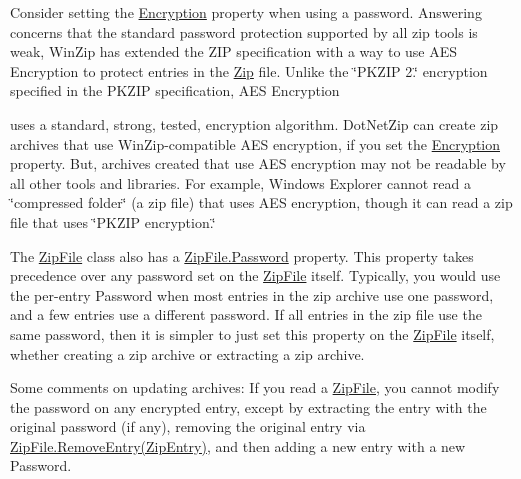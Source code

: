Consider setting the \mbox{\hyperlink{class_super_tiled2_unity_1_1_ionic_1_1_zip_1_1_zip_entry_ab8de4882ffe896d2657b27264807ef1c}{Encryption}} property when using a password. Answering concerns that the standard password protection supported by all zip tools is weak, Win\+Zip has extended the Z\+IP specification with a way to use A\+ES Encryption to protect entries in the \mbox{\hyperlink{namespace_super_tiled2_unity_1_1_ionic_1_1_zip}{Zip}} file. Unlike the \char`\"{}\+P\+K\+Z\+I\+P 2.\char`\"{} encryption specified in the P\+K\+Z\+IP specification, A\+ES Encryption

uses a standard, strong, tested, encryption algorithm. Dot\+Net\+Zip can create zip archives that use Win\+Zip-\/compatible A\+ES encryption, if you set the \mbox{\hyperlink{class_super_tiled2_unity_1_1_ionic_1_1_zip_1_1_zip_entry_ab8de4882ffe896d2657b27264807ef1c}{Encryption}} property. But, archives created that use A\+ES encryption may not be readable by all other tools and libraries. For example, Windows Explorer cannot read a \char`\"{}compressed folder\char`\"{} (a zip file) that uses A\+ES encryption, though it can read a zip file that uses \char`\"{}\+P\+K\+Z\+I\+P encryption.\char`\"{} 

The \mbox{\hyperlink{class_super_tiled2_unity_1_1_ionic_1_1_zip_1_1_zip_file}{Zip\+File}} class also has a \mbox{\hyperlink{class_super_tiled2_unity_1_1_ionic_1_1_zip_1_1_zip_file_a32b5a69438b625f81303940ec70f9c39}{Zip\+File.\+Password}} property. This property takes precedence over any password set on the \mbox{\hyperlink{class_super_tiled2_unity_1_1_ionic_1_1_zip_1_1_zip_file}{Zip\+File}} itself. Typically, you would use the per-\/entry Password when most entries in the zip archive use one password, and a few entries use a different password. If all entries in the zip file use the same password, then it is simpler to just set this property on the \mbox{\hyperlink{class_super_tiled2_unity_1_1_ionic_1_1_zip_1_1_zip_file}{Zip\+File}} itself, whether creating a zip archive or extracting a zip archive. 

Some comments on updating archives\+: If you read a {\ttfamily \mbox{\hyperlink{class_super_tiled2_unity_1_1_ionic_1_1_zip_1_1_zip_file}{Zip\+File}}}, you cannot modify the password on any encrypted entry, except by extracting the entry with the original password (if any), removing the original entry via \mbox{\hyperlink{class_super_tiled2_unity_1_1_ionic_1_1_zip_1_1_zip_file_adc89fc6cc55422a648f860be36d6c02f}{Zip\+File.\+Remove\+Entry(\+Zip\+Entry)}}, and then adding a new entry with a new Password. 

